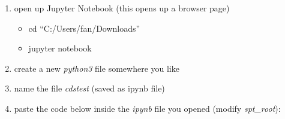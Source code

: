 \documentclass[
]{book}
\providecommand{\tightlist}{%
  \setlength{\itemsep}{0pt}\setlength{\parskip}{0pt}}
\begin{document}
\begin{enumerate}
\def\labelenumi{\arabic{enumi}.}
\item
  open up Jupyter Notebook (this opens up a browser page)

  \begin{itemize}
  \tightlist
  \item
    cd ``C:/Users/fan/Downloads''
  \item
    jupyter notebook
  \end{itemize}
\item
  create a new \emph{python3} file somewhere you like
\item
  name the file \emph{cdstest} (saved as ipynb file)
\item
  paste the code below inside the \emph{ipynb} file you opened (modify \emph{spt\_root}):


\end{enumerate}
\end{document}
